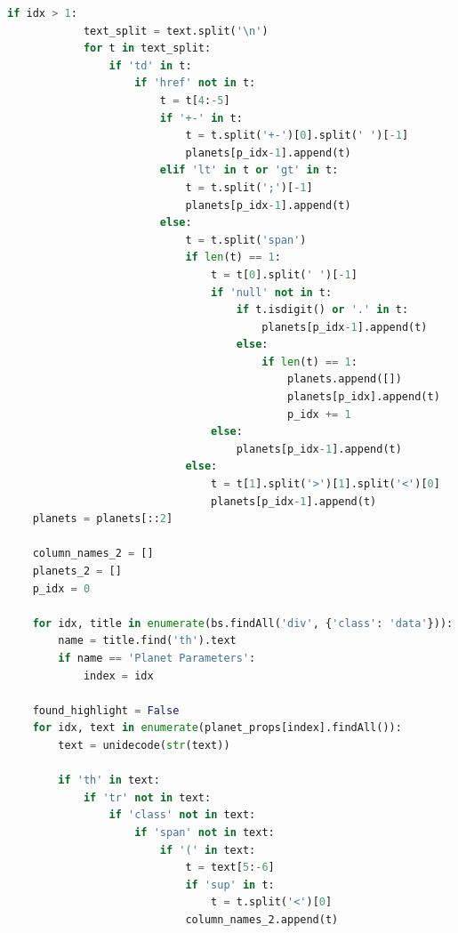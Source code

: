 \documentclass[11pt, oneside]{article}   	%
\begin{document}
\begin{lstlisting}[language=Python, caption={Extracting data from \href{https://exoplanetarchive.ipac.caltech.edu/}{Nasa Exoplanet Archive}}]
        if idx > 1:
            text_split = text.split('\n')
            for t in text_split:
                if 'td' in t:
                    if 'href' not in t:
                        t = t[4:-5]
                        if '+-' in t:
                            t = t.split('+-')[0].split(' ')[-1]
                            planets[p_idx-1].append(t)
                        elif 'lt' in t or 'gt' in t:
                            t = t.split(';')[-1]
                            planets[p_idx-1].append(t)
                        else:
                            t = t.split('span')
                            if len(t) == 1:
                                t = t[0].split(' ')[-1]
                                if 'null' not in t:
                                    if t.isdigit() or '.' in t:
                                        planets[p_idx-1].append(t)
                                    else:
                                        if len(t) == 1:
                                            planets.append([])
                                            planets[p_idx].append(t)
                                            p_idx += 1
                                else:
                                    planets[p_idx-1].append(t)
                            else:
                                t = t[1].split('>')[1].split('<')[0]
                                planets[p_idx-1].append(t)
    planets = planets[::2]

    column_names_2 = []
    planets_2 = []
    p_idx = 0

    for idx, title in enumerate(bs.findAll('div', {'class': 'data'})):
        name = title.find('th').text
        if name == 'Planet Parameters':
            index = idx

    found_highlight = False
    for idx, text in enumerate(planet_props[index].findAll()):
        text = unidecode(str(text))

        if 'th' in text:
            if 'tr' not in text:
                if 'class' not in text:
                    if 'span' not in text:
                        if '(' in text:
                            t = text[5:-6]
                            if 'sup' in t:
                                t = t.split('<')[0]
                            column_names_2.append(t)
                            

\end{lstlisting}
\end{document}
